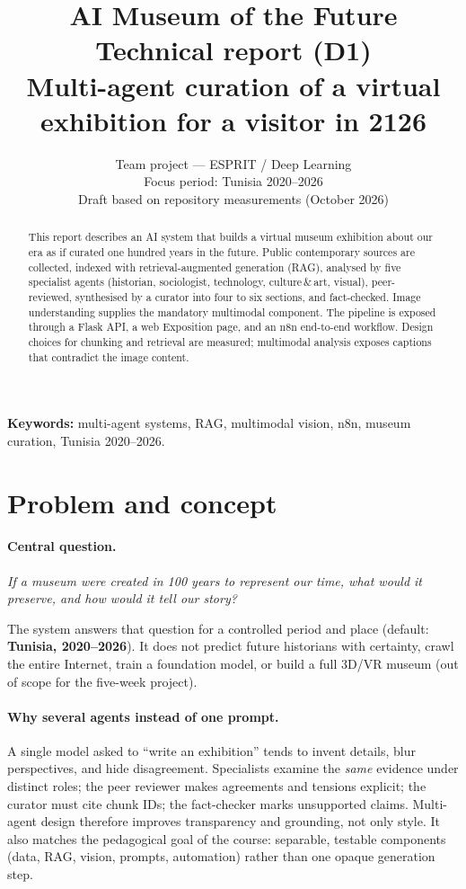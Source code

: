 \documentclass[11pt,a4paper]{article}
\title{\textbf{AI Museum of the Future}\\[0.4em]
\large Technical report (D1)\\[0.3em]
\normalsize Multi-agent curation of a virtual exhibition for a visitor in 2126}
\author{Team project --- ESPRIT / Deep Learning\\
Focus period: Tunisia 2020--2026\\
Draft based on repository measurements (October 2026)}
\date{}
\begin{document}
\maketitle
\thispagestyle{fancy}

\begin{abstract}
\noindent
This report describes an AI system that builds a virtual museum exhibition about our era as if curated one hundred years in the future. Public contemporary sources are collected, indexed with retrieval-augmented generation (RAG), analysed by five specialist agents (historian, sociologist, technology, culture\,\&\,art, visual), peer-reviewed, synthesised by a curator into four to six sections, and fact-checked. Image understanding supplies the mandatory multimodal component. The pipeline is exposed through a Flask API, a web Exposition page, and an n8n end-to-end workflow. Design choices for chunking and retrieval are measured; multimodal analysis exposes captions that contradict the image content.
\end{abstract}

\vspace{0.5em}
\noindent\textbf{Keywords:} multi-agent systems, RAG, multimodal vision, n8n, museum curation, Tunisia 2020--2026.

\tableofcontents
\newpage

\section{Problem and concept}

\paragraph{Central question.}
\textit{If a museum were created in 100 years to represent our time, what would it preserve, and how would it tell our story?}

The system answers that question for a controlled period and place (default: \textbf{Tunisia, 2020--2026}). It does not predict future historians with certainty, crawl the entire Internet, train a foundation model, or build a full 3D/VR museum (out of scope for the five-week project).

\paragraph{Why several agents instead of one prompt.}
A single model asked to ``write an exhibition'' tends to invent details, blur perspectives, and hide disagreement. Specialists examine the \emph{same} evidence under distinct roles; the peer reviewer makes agreements and tensions explicit; the curator must cite chunk IDs; the fact-checker marks unsupported claims. Multi-agent design therefore improves transparency and grounding, not only style. It also matches the pedagogical goal of the course: separable, testable components (data, RAG, vision, prompts, automation) rather than one opaque generation step.
\end{document}
